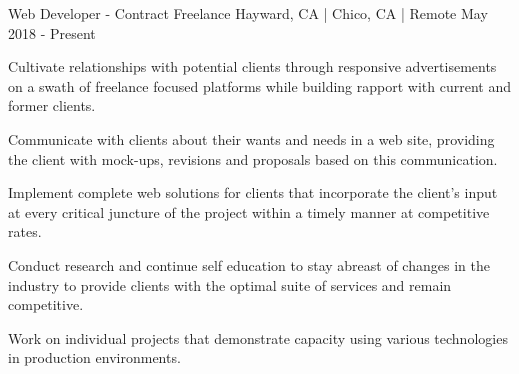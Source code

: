 

\begin{cventries}

  \cventry
    {Web Developer - Contract} %
   {Freelance} %
    {Hayward, CA | Chico, CA | Remote} %
    {May 2018 - Present} %
    {
      \begin{cvitems} %
        \item {Cultivate relationships with potential clients through responsive advertisements on a swath of freelance focused platforms while building rapport with current and former clients.}
        \item {Communicate with clients about their wants and needs in a web site, providing the client with mock-ups, revisions and proposals based on this communication. }
        \item {Implement complete web solutions for clients that incorporate the client's input at every critical juncture of the project within a timely manner at competitive rates.}
        \item {Conduct research and continue self education to stay abreast of changes in the industry to provide clients with the optimal suite of services and remain competitive.}
        \item {Work on individual projects that demonstrate capacity using various technologies in production environments.}
      \end{cvitems}
    }

\end{cventries}
